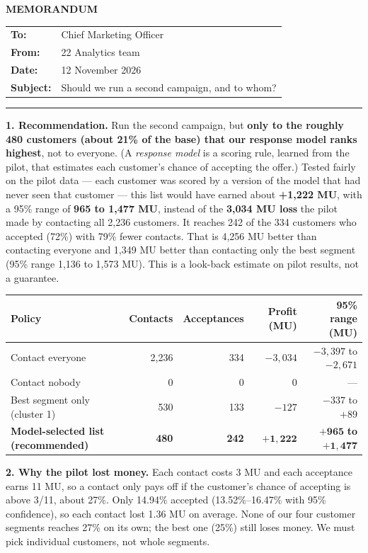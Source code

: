 \documentclass[11pt]{article}
\begin{document}
{\Large\bfseries MEMORANDUM}\par\smallskip
\begin{tabular}{@{}ll}
\textbf{To:} & Chief Marketing Officer\\
\textbf{From:} & 22 Analytics team\\
\textbf{Date:} & 12 November 2026\\
\textbf{Subject:} & Should we run a second campaign, and to whom?
\end{tabular}\par\hrule\medskip

\textbf{1. Recommendation.} Run the second campaign, but \textbf{only to the roughly 480 customers (about 21\% of the base) that our response model ranks highest}, not to everyone. (A \emph{response model} is a scoring rule, learned from the pilot, that estimates each customer's chance of accepting the offer.) Tested fairly on the pilot data --- each customer was scored by a version of the model that had never seen that customer --- this list would have earned about \textbf{+1,222 MU}, with a 95\% range of \textbf{965 to 1,477 MU}, instead of the \textbf{3,034 MU loss} the pilot made by contacting all 2,236 customers. It reaches 242 of the 334 customers who accepted (72\%) with 79\% fewer contacts. That is 4,256 MU better than contacting everyone and 1,349 MU better than contacting only the best segment (95\% range 1,136 to 1,573 MU). This is a look-back estimate on pilot results, not a guarantee.

\begin{center}\small
\begin{tabular}{lrrrr}
\toprule
Policy & Contacts & Acceptances & Profit (MU) & 95\% range (MU)\\
\midrule
Contact everyone & 2,236 & 334 & $-3{,}034$ & $-3{,}397$ to $-2{,}671$\\
Contact nobody & 0 & 0 & 0 & ---\\
Best segment only (cluster 1) & 530 & 133 & $-127$ & $-337$ to $+89$\\
\textbf{Model-selected list (recommended)} & \textbf{480} & \textbf{242} & $\mathbf{+1{,}222}$ & $\mathbf{+965}$ \textbf{to} $\mathbf{+1{,}477}$\\
\bottomrule
\end{tabular}\end{center}

\textbf{2. Why the pilot lost money.} Each contact costs 3 MU and each acceptance earns 11 MU, so a contact only pays off if the customer's chance of accepting is above 3/11, about 27\%. Only 14.94\% accepted (13.52\%--16.47\% with 95\% confidence), so each contact lost 1.36 MU on average. None of our four customer segments reaches 27\% on its own; the best one (25\%) still loses money. We must pick individual customers, not whole segments.
\end{document}
